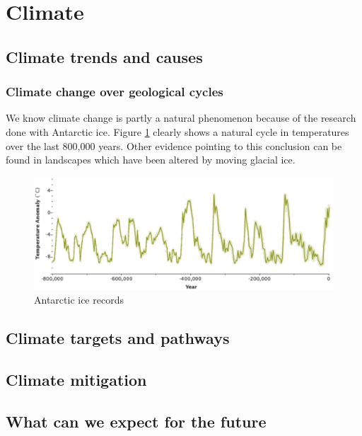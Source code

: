 \documentclass[../summary.tex]{subfiles}
\begin{document}
	
	\section{Climate}
		
		\subsection{Climate trends and causes}
			\subsubsection{Climate change over geological cycles}
				We know climate change is partly a natural phenomenon because of the research done with Antarctic ice. Figure \ref{fig:1-antarctic-ice-records} clearly shows a natural cycle in temperatures over the last 800,000 years. Other evidence pointing to this conclusion can be found in landscapes which have been altered by moving glacial ice.
				\begin{figure}[h]
					\centering
					\includegraphics[width=0.7\linewidth]{../images/1-antarctic-ice-records.png}
					\caption{Antarctic ice records}
					\label{fig:1-antarctic-ice-records}
				\end{figure}
		\subsection{Climate targets and pathways}
		
		\subsection{Climate mitigation}
		
		\subsection{What can we expect for the future}
	
\end{document}
